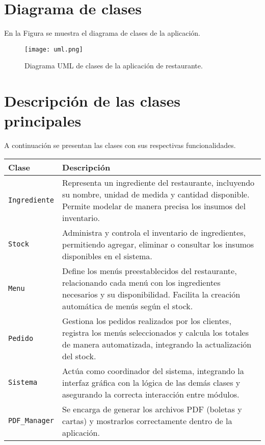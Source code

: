 \documentclass[12pt,a4paper]{article}
\begin{document}
\newpage

\section{Diagrama de clases}

En la Figura se muestra el diagrama de clases de la aplicación. 

\begin{figure}[H]
    \centering
    \texttt{[image: uml.png]}
    \caption{Diagrama UML de clases de la aplicación de restaurante.}
    \label{fig:uml}
\end{figure}

\newpage
\section{Descripción de las clases principales}
A continuación se presentan las clases con sus respectivas funcionalidades.

\begin{table}[H]
\centering
\begin{tabular}{|p{3cm}|p{10cm}|}
\hline
\textbf{Clase} & \textbf{Descripción} \\ \hline
\texttt{Ingrediente} & Representa un ingrediente del restaurante, incluyendo su nombre, unidad de medida y cantidad disponible. Permite modelar de manera precisa los insumos del inventario. \\ \hline
\texttt{Stock} & Administra y controla el inventario de ingredientes, permitiendo agregar, eliminar o consultar los insumos disponibles en el sistema. \\ \hline
\texttt{Menu} & Define los menús preestablecidos del restaurante, relacionando cada menú con los ingredientes necesarios y su disponibilidad. Facilita la creación automática de menús según el stock. \\ \hline
\texttt{Pedido} & Gestiona los pedidos realizados por los clientes, registra los menús seleccionados y calcula los totales de manera automatizada, integrando la actualización del stock. \\ \hline
\texttt{Sistema} & Actúa como coordinador del sistema, integrando la interfaz gráfica con la lógica de las demás clases y asegurando la correcta interacción entre módulos. \\ \hline
\texttt{PDF\_Manager} & Se encarga de generar los archivos PDF (boletas y cartas) y mostrarlos correctamente dentro de la aplicación.\\ \hline
\end{tabular}
\end{table}
\end{document}
